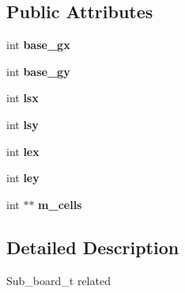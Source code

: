 \subsection*{Public Attributes}
\begin{DoxyCompactItemize}
\item 
\hypertarget{classknight__path__t_1_1sub__board__t_a7a4696165b7e39918218f948bb8be53d}{int {\bfseries base\-\_\-gx}}\label{classknight__path__t_1_1sub__board__t_a7a4696165b7e39918218f948bb8be53d}

\item 
\hypertarget{classknight__path__t_1_1sub__board__t_a1eda408d7dbf391fe970c3a52726f7ee}{int {\bfseries base\-\_\-gy}}\label{classknight__path__t_1_1sub__board__t_a1eda408d7dbf391fe970c3a52726f7ee}

\item 
\hypertarget{classknight__path__t_1_1sub__board__t_a1f02f48f32f64de7eba092e57095330e}{int {\bfseries lsx}}\label{classknight__path__t_1_1sub__board__t_a1f02f48f32f64de7eba092e57095330e}

\item 
\hypertarget{classknight__path__t_1_1sub__board__t_a34d3cd05001215cacb86b6f82f636494}{int {\bfseries lsy}}\label{classknight__path__t_1_1sub__board__t_a34d3cd05001215cacb86b6f82f636494}

\item 
\hypertarget{classknight__path__t_1_1sub__board__t_a8291fc317735adf349adee6387fa0633}{int {\bfseries lex}}\label{classknight__path__t_1_1sub__board__t_a8291fc317735adf349adee6387fa0633}

\item 
\hypertarget{classknight__path__t_1_1sub__board__t_a9f83e34638150a89fd29ea8f74e8ca6b}{int {\bfseries ley}}\label{classknight__path__t_1_1sub__board__t_a9f83e34638150a89fd29ea8f74e8ca6b}

\item 
\hypertarget{classknight__path__t_1_1sub__board__t_a608d03f5dd650d56a2ce511a4d8979e7}{int $\ast$$\ast$ {\bfseries m\-\_\-cells}}\label{classknight__path__t_1_1sub__board__t_a608d03f5dd650d56a2ce511a4d8979e7}

\end{DoxyCompactItemize}


\subsection{Detailed Description}
Sub\-\_\-board\-\_\-t related 


